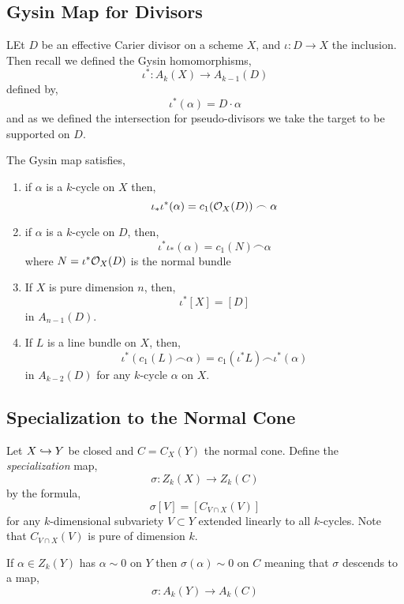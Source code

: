 \documentclass[12pt]{article}
\begin{document}
\subsection{Gysin Map for Divisors}

LEt $D$ be an effective Carier divisor on a scheme $X$, and $\iota : D \to X$ the inclusion. Then recall we defined the Gysin homomorphisms,
\[ \iota^* : A_k(X) \to A_{k-1}(D) \]
defined by,
\[ \iota^*(\alpha) = D \cdot \alpha \]
and as we defined the intersection for pseudo-divisors we take the target to be supported on $D$.

\begin{prop}
The Gysin map satisfies,
\begin{enumerate}
\item if $\alpha$ is a $k$-cycle on $X$ then,
\[ \iota_* \iota^*(\alpha) = c_1(\mathcal{O}_{X}(D)) \frown \alpha \]

\item if $\alpha$ is a $k$-cycle on $D$, then,
\[ \iota^* \iota_*(\alpha) = c_1(N) \frown \alpha\] 
where $N = \iota^* \mathcal{O}_{X}(D)$ is the normal bundle

\item If $X$ is pure dimension $n$, then,
\[ \iota^* [X] = [D] \]
in $A_{n-1}(D)$.

\item If $L$ is a line bundle on $X$, then,
\[ \iota^* (c_1(L) \frown \alpha) = c_1(\iota^* L) \frown \iota^*(\alpha) \]
in $A_{k-2}(D)$ for any $k$-cycle $\alpha$ on $X$.
\end{enumerate}
\end{prop}

\subsection{Specialization to the Normal Cone}

Let $X \hookrightarrow Y$ be closed and $C = C_X(Y)$ the normal cone. Define the \textit{specialization} map,
\[ \sigma : Z_k(X) \to Z_k(C) \]
by the formula,
\[ \sigma [V] = [C_{V \cap X}(V)] \]
for any $k$-dimensional subvariety $V \subset Y$ extended linearly to all $k$-cycles. Note that $C_{V \cap X}(V)$ is pure of dimension $k$.

\begin{prop}
If $\alpha \in Z_k(Y)$ has $\alpha \sim 0$ on $Y$ then $\sigma(\alpha) \sim 0$ on $C$ meaning that $\sigma$ descends to a map,
\[ \sigma : A_k(Y) \to A_k(C) \]
\end{prop}
\end{document}
